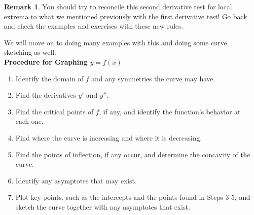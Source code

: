 \documentclass[leqno]{article}
\theoremstyle{definition}
\newtheorem{remark}{Remark}[section]
\theoremstyle{remark}
\theoremstyle{theorem}
\begin{document}
\begin{remark}
You should try to reconcile this second derivative test for local extrema to what we mentioned previously with the first derivative test! Go back and check the examples and exercises with these new rules.
\end{remark}

We will move on to doing many examples with this and doing some curve sketching as well.\\

\noindent \textbf{Procedure for Graphing $y=f(x)$}
\begin{enumerate}[1.]
\item Identify the domain of $f$ and any symmetries the curve may have.
\item Find the derivatives $y'$ and $y''$.
\item Find the critical points of $f$, if any, and identify the function's behavior at each one.
\item Find where the curve is increasing and where it is decreasing.
\item Find the points of inflection, if any occur, and determine the concavity of the curve.
\item Identify any asymptotes that may exist.
\item Plot key points, such as the intercepts and the points found in Steps 3-5, and sketch the curve together with any asymptotes that exist.
\end{enumerate}
\end{document}
